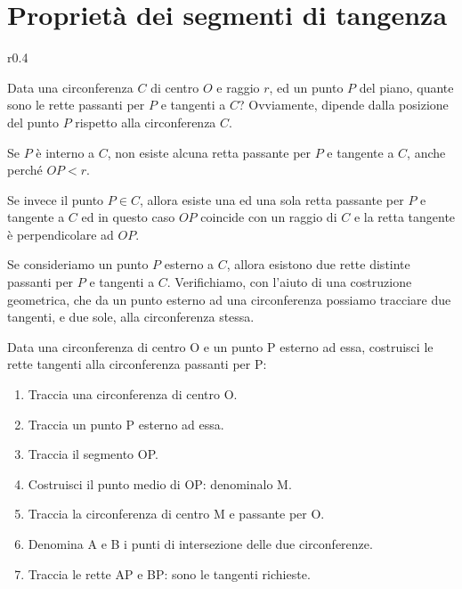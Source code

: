 \section{Proprietà dei segmenti di tangenza} 
\label{sect:proprieta_tangenti}

\begin{wrapfigure}{r}{0.4\textwidth}
\centering
\vspace{10pt}

\end{wrapfigure}
Data una circonferenza \(C\) di centro \(O\) e raggio \(r\), ed un punto 
\(P\) del piano, quante sono le rette passanti per \(P\) e tangenti a \(C\)? 
 Ovviamente, dipende dalla posizione del punto \(P\) rispetto alla 
circonferenza \(C\).

Se \(P\) è interno a \(C\), non esiste alcuna retta passante per \(P\) e 
tangente a \(C\), anche perché \(OP < r\).

Se invece il punto \(P\in C\), allora esiste una ed una sola retta 
passante per \(P\) e tangente a \(C\) ed in questo caso \(OP\) coincide con 
un raggio di \(C\) e la retta tangente è perpendicolare ad \(OP\).

Se consideriamo un punto \(P\) esterno a \(C\), allora esistono due rette 
distinte passanti per \(P\) e tangenti a \(C\). Verifichiamo, con l'aiuto 
di una costruzione geometrica, che da un punto esterno ad una 
circonferenza possiamo tracciare due tangenti, e due sole, alla 
circonferenza stessa.

\begin{procedura}
  Data una circonferenza di centro O e un punto P esterno ad essa, 
costruisci le rette tangenti alla circonferenza passanti per P:
  \begin{enumerate} [nosep]
    \item 
    Traccia una circonferenza di centro O.
    \item 
    Traccia un punto P esterno ad essa.
    \item 
    Traccia il segmento OP.
    \item 
    Costruisci il punto medio di OP: denominalo M.
    \item 
    Traccia la circonferenza di centro M e passante per O.
    \item 
    Denomina A e B i punti di intersezione delle due circonferenze.
    \item 
    Traccia le rette AP e BP: sono le tangenti richieste.  
  \end{enumerate}
\end{procedura}

